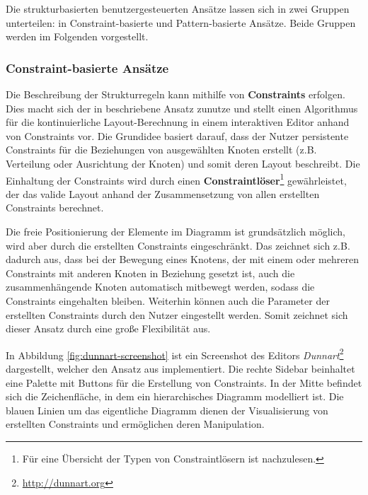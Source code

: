 Die strukturbasierten benutzergesteuerten Ansätze lassen sich in zwei Gruppen unterteilen: in Constraint-basierte und Pattern-basierte Ansätze. Beide Gruppen werden im Folgenden vorgestellt.

\subsubsection{Constraint-basierte Ansätze}
\label{subsubsec:constraint-based-approaches}

Die Beschreibung der Strukturregeln kann mithilfe von \textbf{Constraints} erfolgen. Dies macht sich der in \cite{Wybrow08Using} beschriebene Ansatz zunutze und stellt einen Algorithmus für die kontinuierliche Layout-Berechnung in einem interaktiven Editor anhand von Constraints vor. Die Grundidee basiert darauf, dass der Nutzer persistente Constraints für die Beziehungen von ausgewählten Knoten erstellt (z.B. Verteilung oder Ausrichtung der Knoten) und somit deren Layout beschreibt. Die Einhaltung der Constraints wird durch einen \textbf{Constraintlöser}\footnote{Für eine Übersicht der Typen von Constraintlösern ist \cite[S.18ff]{Maier12A-Pattern-based} nachzulesen.} gewährleistet, der das valide Layout anhand der Zusammensetzung von allen erstellten Constraints berechnet.

Die freie Positionierung der Elemente im Diagramm ist grundsätzlich 
möglich, wird aber durch die erstellten Constraints eingeschränkt. Das zeichnet sich z.B. dadurch aus, dass bei der Bewegung eines Knotens, der mit einem oder mehreren Constraints mit anderen Knoten in Beziehung gesetzt ist, auch die zusammenhängende Knoten automatisch mitbewegt werden, sodass die Constraints eingehalten bleiben. Weiterhin können auch die Parameter der erstellten Constraints durch den Nutzer eingestellt werden. Somit zeichnet sich dieser Ansatz durch eine große Flexibilität aus.

In Abbildung \ref{fig:dunnart-screenshot} ist ein Screenshot des Editors \textit{Dunnart}\footnote{\url{http://dunnart.org}} dargestellt, welcher den Ansatz aus \cite{Wybrow08Using} implementiert. Die rechte Sidebar beinhaltet eine Palette mit Buttons für die Erstellung von Constraints. In der Mitte befindet sich die Zeichenfläche, in dem ein hierarchisches Diagramm modelliert ist. Die blauen Linien um das eigentliche Diagramm dienen der Visualisierung von erstellten Constraints und ermöglichen deren Manipulation.

